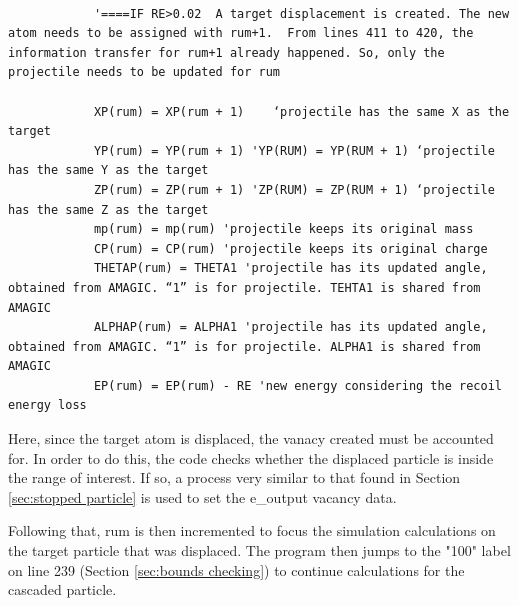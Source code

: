 \documentclass[10pt, reqno]{exam}
\begin{document}
\begin{verbatim}   

            '====IF RE>0.02  A target displacement is created. The new atom needs to be assigned with rum+1.  From lines 411 to 420, the information transfer for rum+1 already happened. So, only the projectile needs to be updated for rum
    
            XP(rum) = XP(rum + 1)    ‘projectile has the same X as the target
            YP(rum) = YP(rum + 1) 'YP(RUM) = YP(RUM + 1) ‘projectile has the same Y as the target
            ZP(rum) = ZP(rum + 1) 'ZP(RUM) = ZP(RUM + 1) ‘projectile has the same Z as the target
            mp(rum) = mp(rum) 'projectile keeps its original mass
            CP(rum) = CP(rum) 'projectile keeps its original charge
            THETAP(rum) = THETA1 'projectile has its updated angle, obtained from AMAGIC. “1” is for projectile. TEHTA1 is shared from AMAGIC
            ALPHAP(rum) = ALPHA1 'projectile has its updated angle, obtained from AMAGIC. “1” is for projectile. ALPHA1 is shared from AMAGIC
            EP(rum) = EP(rum) - RE 'new energy considering the recoil energy loss
\end{verbatim}

Here, since the target atom is displaced, the vanacy created must be accounted for. In order to do this, the code checks whether the displaced particle is inside the range of interest. If so, a process very similar to that found in Section \ref{sec:stopped particle} is used to set the e\_output vacancy data. \par

Following that, rum is then incremented to focus the simulation calculations on the target particle that was displaced. The program then jumps to the "100" label on line 239 (Section \ref{sec:bounds checking}) to continue calculations for the cascaded particle.
\end{document}
